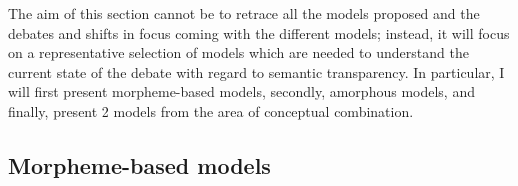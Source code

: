 The aim of this section cannot be to retrace all the models proposed and the debates and shifts in focus coming with the different models;
instead, it will focus on a representative selection of models
which are needed to understand the current state of the debate with regard to semantic transparency.
In particular, I will first present morpheme-based models, secondly, amorphous models, and finally, present 2 models from the area of conceptual combination.









\subsection{Morpheme-based models}
\label{sec:morpheme-based}

